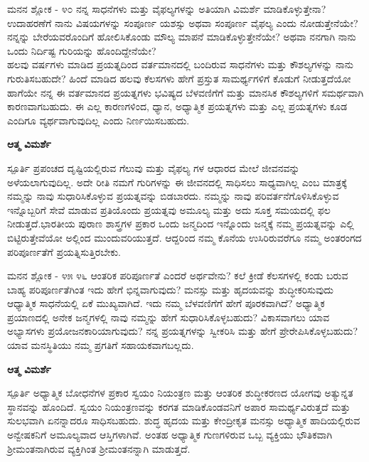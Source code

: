 \newpage
\begin{mananam}{\mananamfont \large{ಮನನ ಶ್ಲೋಕ - ೪೦}}
\mananamtext ನನ್ನ ಸಾಧನೆಗಳು ಮತ್ತು ವೈಫಲ್ಯಗಳನ್ನು ಅತಿಯಾಗಿ ವಿಮರ್ಶೆ ಮಾಡಿಕೊಳ್ಳುತ್ತೇನಾ? ಉದಾಹರಣೆಗೆ ನಾನು ವಿಷಯಗಳನ್ನು ಸಂಪೂರ್ಣ ಯಶಸ್ಸು ಅಥವಾ ಸಂಪೂರ್ಣ ವೈಫಲ್ಯ ಎಂದು ನೋಡುತ್ತೇನೆಯೇ? ನನ್ನನ್ನು ಬೇರೆಯವರೊಂದಿಗೆ ಹೋಲಿಸಿಕೊಂಡು ಮೌಲ್ಯ ಮಾಪನೆ ಮಾಡಿಕೊಳ್ಳುತ್ತೇನೆಯೇ? ಅಥವಾ ನನಗಾಗಿ ನಾನು ಒಂದು ನಿರ್ದಿಷ್ಟ ಗುರಿಯನ್ನು ಹೊಂದಿದ್ದೇನೆಯೇ?\\
ಹಲವು ವರ್ಷಗಳು ಮಾಡಿದ ಪ್ರಯತ್ನದಿಂದ ವರ್ತಮಾನದಲ್ಲಿ  ಬಂದಿರುವ ಸಾಧನೆಗಳು ಮತ್ತು ಕೌಶಲ್ಯಗಳನ್ನು ನಾನು ಗುರುತಿಸಬಹುದೇ? ಹಿಂದೆ ಮಾಡಿದ ಹಲವು ಕೆಲಸಗಳು ಹೇಗೆ ಪ್ರಸ್ತುತ ಸಾಮರ್ಥ್ಯಗಳಿಗೆ ಕೊಡುಗೆ ನೀಡುತ್ತದೆಯೋ ಹಾಗೆಯೇ ನನ್ನ ಈ ವರ್ತಮಾನದ ಪ್ರಯತ್ನಗಳು ಭವಿಷ್ಯದ ಬೆಳವಣಿಗೆಗೆ ಮತ್ತು ಮಾನಸಿಕ ಕೌಶಲ್ಯಗಳಿಗೆ ಸಮರ್ಥವಾಗಿ ಕಾರಣವಾಗಬಹುದು. ಈ ಎಲ್ಲ ಕಾರಣಗಳಿಂದ, ಧ್ಯಾನ, ಅಧ್ಯಾತ್ಮಿಕ ಪ್ರಯತ್ನಗಳು ಮತ್ತು ಎಲ್ಲ ಪ್ರಯತ್ನಗಳು ಕೂಡ ಎಂದಿಗೂ ವ್ಯರ್ಥವಾಗುವುದಿಲ್ಲ  ಎಂದು ನಿರ್ಣಯಿಸಬಹುದು.
\end{mananam}
\WritingHand\enspace\textbf{ಆತ್ಮ ವಿಮರ್ಶೆ}\\
\begin{inspiration}{\mananamfont \large ಸ್ಪೂರ್ತಿ}
\small \mananamtext ಪ್ರಪಂಚದ ದೃಷ್ಟಿಯಲ್ಲಿರುವ ಗೆಲುವು ಮತ್ತು ವೈಫಲ್ಯ ಗಳ ಆಧಾರದ ಮೇಲೆ ಜೀವನವನ್ನು ಅಳೆಯಲಾಗುವುದಿಲ್ಲ. ಅದೇ ರೀತಿ ನಮಗೆ ಗುರಿಗಳನ್ನು ಈ ಜೀವನದಲ್ಲಿ ಸಾಧಿಸಲು ಸಾಧ್ಯವಾಗಿಲ್ಲ ಎಂಬ ಮಾತ್ರಕ್ಕೆ ನಮ್ಮನ್ನು ನಾವು ಸುಧಾರಿಸಿಕೊಳ್ಳುವ ಪ್ರಯತ್ನವನ್ನು ಬಿಡಬಾರದು. ನಮ್ಮನ್ನು ನಾವು ಪರಿವರ್ತನೆಗೊಳಿಸಿಕೊಳ್ಳುವ ಇನ್ನೊಬ್ಬರಿಗೆ ಸೇವೆ ಮಾಡುವ ಪ್ರತಿಯೊಂದು ಪ್ರಯತ್ನವು ಅಮೂಲ್ಯ ಮತ್ತು ಅದು ಸೂಕ್ತ ಸಮಯದಲ್ಲಿ ಫಲ ನೀಡುತ್ತದೆ.ಭಾರತೀಯ ಪುರಾಣ ಶಾಸ್ತ್ರಗಳ ಪ್ರಕಾರ ಒಂದು ಜನ್ಮದಿಂದ ಇನ್ನೊಂದು ಜನ್ಮಕ್ಕೆ ನಮ್ಮ ಪ್ರಯತ್ನವನ್ನು ಎಲ್ಲಿ ಬಿಟ್ಟಿರುತ್ತೇವೆಯೋ  ಅಲ್ಲಿಂದ ಮುಂದುವರಿಯುತ್ತದೆ. ಆದ್ದರಿಂದ ನಮ್ಮ ಕೊನೆಯ ಉಸಿರಿರುವರೆಗೂ ನಮ್ಮ ಅಂತರಂಗದ ಪರಿಪೂರ್ಣತೆಗೆ ಪ್ರಯತ್ನಿಸುತ್ತಿರಬೇಕು.
\end{inspiration}
\newpage

\newpage
\begin{mananam}{\mananamfont \large{ಮನನ ಶ್ಲೋಕ - ೪೫ ೪೬}}
\mananamtext ಆಂತರಿಕ ಪರಿಪೂರ್ಣತೆ ಎಂದರೆ  ಅರ್ಥವೇನು? ಕಲೆ ಕ್ರೀಡೆ ಕೆಲಸಗಳಲ್ಲಿ ಕಂಡು ಬರುವ ಬಾಹ್ಯ ಪರಿಪೂರ್ಣತೆಗಿಂತ ಇದು ಹೇಗೆ  ಭಿನ್ನವಾಗುವುದು? ಮನಸ್ಸು ಮತ್ತು ಹೃದಯವನ್ನು ಶುದ್ಧೀಕರಿಸುವುದು ಆಧ್ಯಾತ್ಮಿಕ ಸಾಧನೆಯಲ್ಲಿ ಏಕೆ ಮುಖ್ಯವಾಗಿದೆ. ಇದು ನಮ್ಮ ಬೆಳವಣಿಗೆಗೆ ಹೇಗೆ ಪೂರಕವಾಗಿದೆ?
ಅಧ್ಯಾತ್ಮಿಕ ಪ್ರಯಾಣದಲ್ಲಿ ಅನೇಕ ಜನ್ಮಗಳಲ್ಲಿ ನಾವು ನಮ್ಮನ್ನು ಹೇಗೆ ಸುಧಾರಿಸಿಕೊಳ್ಳಬಹುದು? ವಿಕಾಸವಾಗಲು ಯಾವ ಅಭ್ಯಾಸಗಳು ಪ್ರಯೋಜನಕಾರಿಯಾಗುವುದು?
ನನ್ನ ಪ್ರಯತ್ನಗಳನ್ನು ಸ್ವೀಕರಿಸಿ ಮತ್ತು ಹೇಗೆ ಪ್ರೇರೇಪಿಸಿಕೊಳ್ಳಬಹುದು?ಯಾವ ಮನಸ್ಥಿತಿಯು ನಮ್ಮ ಪ್ರಗತಿಗೆ ಸಹಾಯಕವಾಗಬಲ್ಲದು.
\end{mananam}
\WritingHand\enspace\textbf{ಆತ್ಮ ವಿಮರ್ಶೆ}\\
\begin{inspiration}{\mananamfont \large ಸ್ಪೂರ್ತಿ}
\mananamtext ಅಧ್ಯಾತ್ಮಿಕ ಬೋಧನೆಗಳ ಪ್ರಕಾರ ಸ್ವಯಂ ನಿಯಂತ್ರಣ ಮತ್ತು ಆಂತರಿಕ ಶುದ್ಧೀಕರಣದ ಯೋಗವು ಅತ್ಯುನ್ನತ ಸ್ಥಾನವನ್ನು ಹೊಂದಿದೆ. ಸ್ವಯಂ ನಿಯಂತ್ರಣವನ್ನು ಕರಗತ ಮಾಡಿಕೊಂಡವನಿಗೆ ಅಪಾರ ಸಾಮರ್ಥ್ಯವಿರುತ್ತದೆ ಮತ್ತು ಸುಲಭವಾಗಿ ಏನನ್ನಾದರೂ ಸಾಧಿಸಬಹುದು. ಶುದ್ಧ ಹೃದಯ ಮತ್ತು ಕೇಂದ್ರೀಕೃತ ಮನಸ್ಸು ಅಧ್ಯಾತ್ಮಿಕ ಹಾದಿಯಲ್ಲಿರುವ ಅನ್ವೇಷಕನಿಗೆ ಅಮೂಲ್ಯವಾದ ಆಸ್ತಿಗಳಾಗಿವೆ. ಅಂತಹ ಅಧ್ಯಾತ್ಮಿಕ ಗುಣಗಳಿರುವ ಒಬ್ಬ ವ್ಯಕ್ತಿಯು ಭೌತಿಕವಾಗಿ ಶ್ರೀಮಂತನಾಗಿರುವ ವ್ಯಕ್ತಿಗಿಂತ ಶ್ರೀಮಂತನನ್ನಾಗಿ ಮಾಡುತ್ತದೆ.
\end{inspiration}
\newpage


